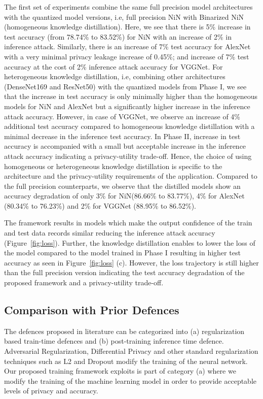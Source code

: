 The first set of experiments combine the same full precision model architectures with the quantized model versions, i.e, full precision NiN with Binarized NiN (homogeneous knowledge distillation).
Here, we see that there is 5\% increase in test accuracy (from 78.74\% to 83.52\%) for NiN with an increase of 2\% in inference attack.
Similarly, there is an increase of 7\% test accuracy for AlexNet with a very minimal privacy leakage increase of 0.45\%; and increase of 7\% test accuracy at the cost of 2\% inference attack accuracy for VGGNet.
For heterogeneous knowledge distillation, i.e, combining other architectures (DenseNet169 and ResNet50) with the quantized models from Phase I, we see that the increase in test accuracy is only minimally higher than the homogeneous models for NiN and AlexNet but a significantly higher increase in the inference attack accuracy.
However, in case of VGGNet, we observe an increase of 4\% additional test accuracy compared to homogeneous knowledge distillation with a minimal decrease in the inference test accuracy.
In Phase II, increase in test accuracy is accompanied with a small but acceptable increase in the inference attack accuracy indicating a privacy-utility trade-off.
Hence, the choice of using homogeneous or heterogeneous knowledge distillation is specific to the architecture and the privacy-utility requirements of the application.
Compared to the full precision counterparts, we observe that the distilled models show an accuracy degradation of only 3\% for NiN(86.66\% to 83.77\%), 4\% for AlexNet (80.34\% to 76.23\%) and 2\% for VGGNet (88.95\% to 86.52\%).

The \method\hspace{0.02in} framework results in models which make the output confidence of the train and test data records similar reducing the inference attack accuracy (Figure~\ref{fig:loss}).
Further, the knowledge distillation enables to lower the loss of the model compared to the model trained in Phase I resulting in higher test accuracy as seen in Figure~\ref{fig:loss} (c).
However, the loss trajectory is still higher than the full precision version indicating the test accuracy degradation of the proposed framework and a privacy-utility trade-off.

\subsection{Comparison with Prior Defences}
\label{eval-defences}

The defences proposed in literature can be categorized into (a) regularization based train-time defences and (b) post-training inference time defence.
Adversarial Regularization, Differential Privacy and other standard regularization techniques such as L2 and Dropout modify the training of the neural network.
Our proposed training framework exploits is part of category (a) where we modify the training of the machine learning model in order to provide acceptable levels of privacy and accuracy.

